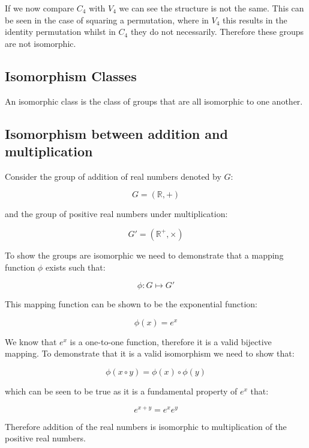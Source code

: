 \documentclass{article}
\newcommand*{\blackboard}[1]{\mathbb{#1}}%
\begin{document}
If we now compare $C_{4}$ with $V_{4}$ we can see the structure is not the same. This can be seen in the case of squaring a permutation, where in $V_{4}$ this results in the identity permutation whilst in $C_{4}$ they do not necessarily. Therefore these groups are not isomorphic.

\subsection{Isomorphism Classes}

An isomorphic class is the class of groups that are all isomorphic to one another.

\subsection{Isomorphism between addition and multiplication}

Consider the group of addition of real numbers denoted by $G$:

\[ G = (\blackboard{R}, +) \]

and the group of positive real numbers under multiplication:

\[ G' = (\blackboard{R}^{+}, \times) \]

To show the groups are isomorphic we need to demonstrate that a mapping function $\phi$ exists such that:

\[ \phi: G \mapsto G' \]

This mapping function can be shown to be the exponential function:

\[ \phi(x) = e^{x} \]

We know that $e^{x}$ is a one-to-one function, therefore it is a valid bijective mapping. To demonstrate that it is a valid isomorphism we need to show that:

\[ \phi(x \circ y) = \phi(x) \circ \phi(y) \]

which can be seen to be true as it is a fundamental property of $e^{x}$ that:

\[ e^{x + y} = e^{x}e^{y} \]

Therefore addition of the real numbers is isomorphic to multiplication of the positive real numbers.
\end{document}
